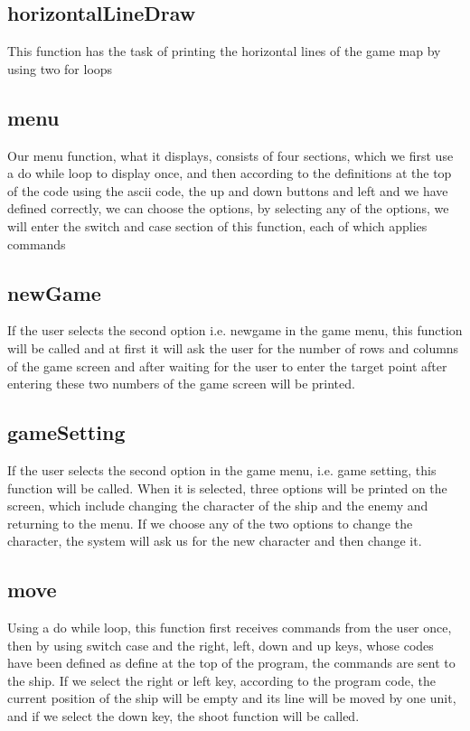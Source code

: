 \documentclass[12pt,a4paper]{article}
\begin{document}
	\subsection{horizontalLineDraw}
	This function has the task of printing the horizontal lines of the game map by using two for loops
	\subsection{menu}
	Our menu function, what it displays, consists of four sections, which we first use a do while loop to display once, and then according to the definitions at the top of the code using the ascii code, the up and down buttons and left
	and we have defined correctly, we can choose the options, by selecting any of the options, we will enter the switch and case section of this function, each of which applies commands
	
	\subsection{newGame}
	If the user selects the second option i.e. newgame in the game menu, 
	this function will be called and at first it will ask the user for the number of rows and columns of the game screen and after waiting for the user to enter the target point after entering these two numbers of the game screen will be printed.
	\subsection{gameSetting}
	If the user selects the second option in the game menu, i.e. game setting, this function will be called. When it is selected, 
	three options will be printed on the screen, which include changing the character of the ship and the enemy and returning to the menu. If we choose any of the two options to change the character, 
	the system will ask us for the new character and then change it.
	\subsection{move}
	Using a do while loop, this function first receives commands from the user once, then by using switch case and the right, left, down and up keys,
	whose codes have been defined as define at the top of the program, the commands are sent to the ship. If we select the right or left key,
	according to the program code, the current position of the ship will be empty and its line will be moved by one unit, and if we select the down key,
	the shoot function will be called.
\end{document}
